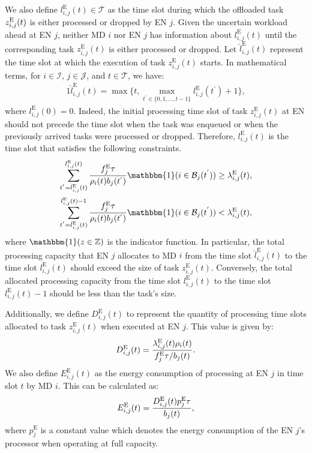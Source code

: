\documentclass[10pt, journal,letterpaper]{IEEEtran}
\begin{document}
We also define $l_{i,j}^{\text{E}}(t) \in \mathcal{T}$ as the time slot during which the offloaded task $z_{i,j}^{\text{\text{E}}}(t)$ is either processed or dropped by EN $j$. Given the uncertain workload ahead at EN $j$, neither MD $i$ nor EN $j$ has information about $l_{i,j}^{\text{E}}(t)$ until the corresponding task $z_{i,j}^{\text{E}}(t)$ is either processed or dropped. Let $\hat{l}_{i,j}^{\text{E}}(t)$ represent the time slot at which the execution of task $z_{i,j}^{\text{E}}(t)$ starts. In mathematical terms, for $i \in \mathcal{I}$, $j \in \mathcal{J}$, and $t \in \mathcal{T}$, we have:
\begin{alignat}{1}
	\hat{l}_{i,j}^{\text{E}}(t) = \max \{t, \max \limits_{t^{'} \in \{0,1,\ldots,t-1\}} l_{i,j}^{\text{E}}(t^{'})+1\},
	\label{11}  
\end{alignat}
where $l_{i,j}^{\text{E}}(0) = 0$. Indeed, the initial processing time slot of task $z_{i,j}^{\text{E}}(t)$ at EN should not precede the time slot when the task was enqueued or when the previously arrived tasks were processed or dropped. Therefore, $l_{i,j}^{\text{E}}(t)$ is the time slot that satisfies the following constraints. %
\begin{alignat}{1}
	\sum_{t^{'}=\hat{l}_{i,j}^{\text{E}}(t)}^{l_{i,j}^{\text{E}}(t)}{f_j^{\text{E}}\tau \over \rho_i(t)b_j(t^{'})}\mathbbm{1}(i \in \mathcal{B}_j(t^{'}))  \geq   \lambda_{i,j}^{\text{E}}(t),
	\label{12}  \\
	\sum_{t^{'}=\hat{l}_{i,j}^{\text{E}}(t)}^{l_{i,j}^{\text{E}}(t)-1}{f_j^{\text{E}}\tau \over \rho_i(t)b_j(t^{'})}\mathbbm{1}(i \in \mathcal{B}_j(t^{'})) < \lambda_{i,j}^{\text{E}}(t),
	\label{13}  
\end{alignat}
where $\mathbbm{1} (z \in \mathbb{Z})$ is the indicator function. In particular, the total processing capacity that EN $j$ allocates to MD $i$ from the time slot $\hat{l}_{i,j}^{\text{E}}(t)$ to the time slot $l_{i,j}^{\text{E}}(t)$ should exceed the size of task $z_{i,j}^{\text{E}}(t)$. Conversely, the total allocated processing capacity from the time slot $l_{i,j}^{\text{E}}(t)$ to the time slot $l_{i,j}^{\text{E}}(t)-1$ should be less than the task's size.

Additionally, we define $D_{i,j}^{\text{E}}(t)$ to represent the quantity of processing time slots allocated to task $z_{i,j}^{\text{E}}(t)$ when executed at EN $j$. This value is given by:
\begin{alignat}{1}
	D_{i,j}^{\text{E}}(t) = { \lambda_{i,j}^{\text{E}}(t) \rho_i(t) \over f_j^{\text{E}} \tau /  b_j(t)}.
	\label{14}  
\end{alignat}
We also define $E_{i,j}^{\text{E}}(t)$ as the energy consumption of processing at EN $j$ in time slot $t$ by MD $i$. This can be calculated as:
\begin{alignat}{1}
	E_{i,j}^{\text{E}}(t) = {D_{i,j}^{\text{E}}(t)  p_j^{\text{E}} \tau \over b_j(t)},  %
	\label{15}  
\end{alignat}
where $p_j^{\text{E}}$ is a constant value which denotes the energy consumption of the EN $j$'s processor when operating at full capacity. 
\end{document}
